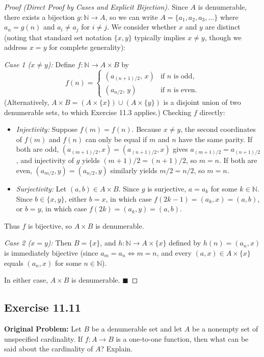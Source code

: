 \documentclass[11pt, letterpaper]{article}
\theoremstyle{definition}
\theoremstyle{remark}
\begin{document}
\begin{proof}[Proof (Direct Proof by Cases and Explicit Bijection)]
Since $A$ is denumerable, there exists a bijection $g : \mathbb{N} \to A$, so we can write $A = \{a_1, a_2, a_3, \dots\}$ where $a_n = g(n)$ and $a_i \neq a_j$ for $i \neq j$. We consider whether $x$ and $y$ are distinct (noting that standard set notation $\{x, y\}$ typically implies $x \neq y$, though we address $x = y$ for complete generality):

\textit{Case 1 ($x \neq y$):} Define $f : \mathbb{N} \to A \times B$ by
\[
f(n) =
\begin{cases}
(a_{(n+1)/2},\, x) & \text{if } n \text{ is odd}, \\
(a_{n/2},\, y) & \text{if } n \text{ is even}.
\end{cases}
\]
(Alternatively, $A \times B = (A \times \{x\}) \cup (A \times \{y\})$ is a disjoint union of two denumerable sets, to which Exercise 11.3 applies.) Checking $f$ directly:
\begin{itemize}
    \item \textit{Injectivity:} Suppose $f(m) = f(n)$. Because $x \neq y$, the second coordinates of $f(m)$ and $f(n)$ can only be equal if $m$ and $n$ have the same parity. If both are odd, $(a_{(m+1)/2}, x) = (a_{(n+1)/2}, x)$ gives $a_{(m+1)/2} = a_{(n+1)/2}$, and injectivity of $g$ yields $(m+1)/2 = (n+1)/2$, so $m = n$. If both are even, $(a_{m/2}, y) = (a_{n/2}, y)$ similarly yields $m/2 = n/2$, so $m = n$.
    \item \textit{Surjectivity:} Let $(a, b) \in A \times B$. Since $g$ is surjective, $a = a_k$ for some $k \in \mathbb{N}$. Since $b \in \{x, y\}$, either $b = x$, in which case $f(2k - 1) = (a_k, x) = (a, b)$, or $b = y$, in which case $f(2k) = (a_k, y) = (a, b)$.
\end{itemize}
Thus $f$ is bijective, so $A \times B$ is denumerable.

\textit{Case 2 ($x = y$):} Then $B = \{x\}$, and $h : \mathbb{N} \to A \times \{x\}$ defined by $h(n) = (a_n, x)$ is immediately bijective (since $a_m = a_n \iff m = n$, and every $(a, x) \in A \times \{x\}$ equals $(a_n, x)$ for some $n \in \mathbb{N}$).

In either case, $A \times B$ is denumerable. $\blacksquare$
\end{proof}

\subsection*{Exercise 11.11}
\textbf{Original Problem:} Let $B$ be a denumerable set and let $A$ be a nonempty set of unspecified cardinality. If $f : A \to B$ is a one-to-one function, then what can be said about the cardinality of $A$? Explain.
\end{document}
